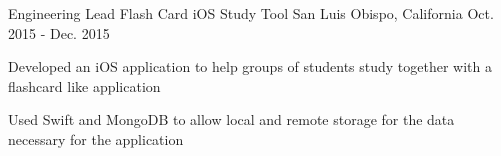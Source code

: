 \begin{cventries}
\cventry
{Engineering Lead} %
{Flash Card iOS Study Tool} %
{San Luis Obispo, California} %
{Oct. 2015 - Dec. 2015} %
{ %
    \begin{cvitems}
    \item {Developed an iOS application to help groups of students study together with a flashcard like application}
    \item {Used Swift and MongoDB to allow local and remote storage for the data necessary for the application}
\end{cvitems}
}

\end{cventries}
